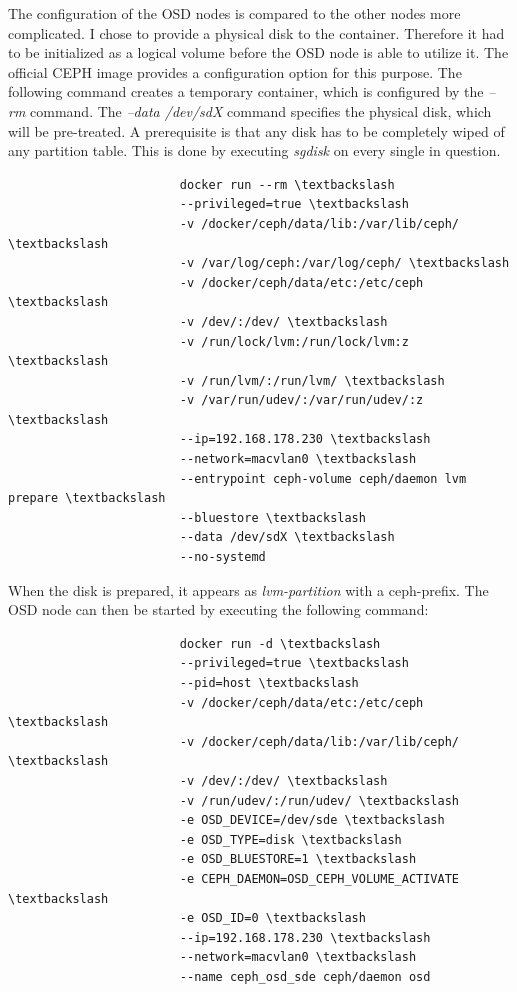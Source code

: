 \documentclass[titlepage, a4paper, 11pt]{scrartcl}
\begin{document}
                    The configuration of the OSD nodes is compared to the other nodes more complicated. I chose to provide a physical disk
                    to the container. Therefore it had to be initialized as a logical volume before the OSD node is able to utilize it.
                    The official CEPH image provides a configuration option for this purpose. The following command creates a temporary container,
                    which is configured by the \textit{--rm} command. The \textit{--data /dev/sdX} command specifies the physical disk, which will be 
                    pre-treated. A prerequisite is that any disk has to be completely wiped of any partition table. This is done by executing \textit{sgdisk}
                    on every single in question.

                    \begin{lstlisting}
                        docker run --rm \textbackslash
                        --privileged=true \textbackslash
                        -v /docker/ceph/data/lib:/var/lib/ceph/ \textbackslash
                        -v /var/log/ceph:/var/log/ceph/ \textbackslash
                        -v /docker/ceph/data/etc:/etc/ceph \textbackslash
                        -v /dev/:/dev/ \textbackslash
                        -v /run/lock/lvm:/run/lock/lvm:z \textbackslash
                        -v /run/lvm/:/run/lvm/ \textbackslash
                        -v /var/run/udev/:/var/run/udev/:z \textbackslash
                        --ip=192.168.178.230 \textbackslash
                        --network=macvlan0 \textbackslash
                        --entrypoint ceph-volume ceph/daemon lvm prepare \textbackslash
                        --bluestore \textbackslash
                        --data /dev/sdX \textbackslash
                        --no-systemd                            
                    \end{lstlisting} 

                    When the disk is prepared, it appears as \textit{lvm-partition} with a ceph-prefix. The OSD node can then be started by executing the following command:

                    \begin{lstlisting}
                        docker run -d \textbackslash
                        --privileged=true \textbackslash
                        --pid=host \textbackslash
                        -v /docker/ceph/data/etc:/etc/ceph \textbackslash
                        -v /docker/ceph/data/lib:/var/lib/ceph/ \textbackslash
                        -v /dev/:/dev/ \textbackslash
                        -v /run/udev/:/run/udev/ \textbackslash
                        -e OSD_DEVICE=/dev/sde \textbackslash
                        -e OSD_TYPE=disk \textbackslash
                        -e OSD_BLUESTORE=1 \textbackslash
                        -e CEPH_DAEMON=OSD_CEPH_VOLUME_ACTIVATE \textbackslash
                        -e OSD_ID=0 \textbackslash
                        --ip=192.168.178.230 \textbackslash
                        --network=macvlan0 \textbackslash
                        --name ceph_osd_sde ceph/daemon osd
                    \end{lstlisting}
\end{document}
